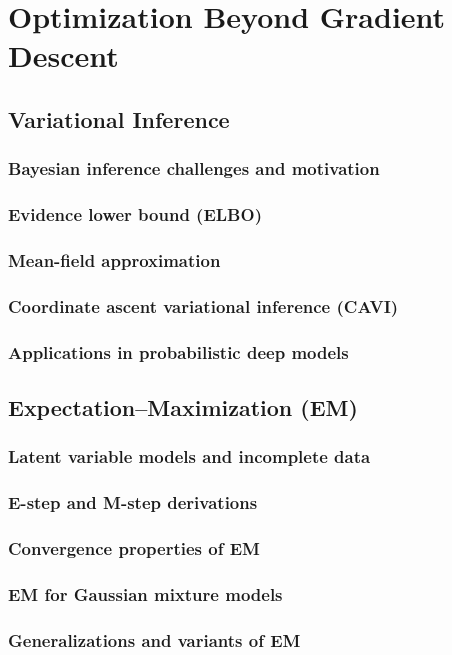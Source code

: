 ﻿\chapter{Optimization Beyond Gradient Descent}
\section{Variational Inference}
\subsection{Bayesian inference challenges and motivation}
\subsection{Evidence lower bound (ELBO)}
\subsection{Mean-field approximation}
\subsection{Coordinate ascent variational inference (CAVI)}
\subsection{Applications in probabilistic deep models}

\section{Expectation--Maximization (EM)}
\subsection{Latent variable models and incomplete data}
\subsection{E-step and M-step derivations}
\subsection{Convergence properties of EM}
\subsection{EM for Gaussian mixture models}
\subsection{Generalizations and variants of EM}

